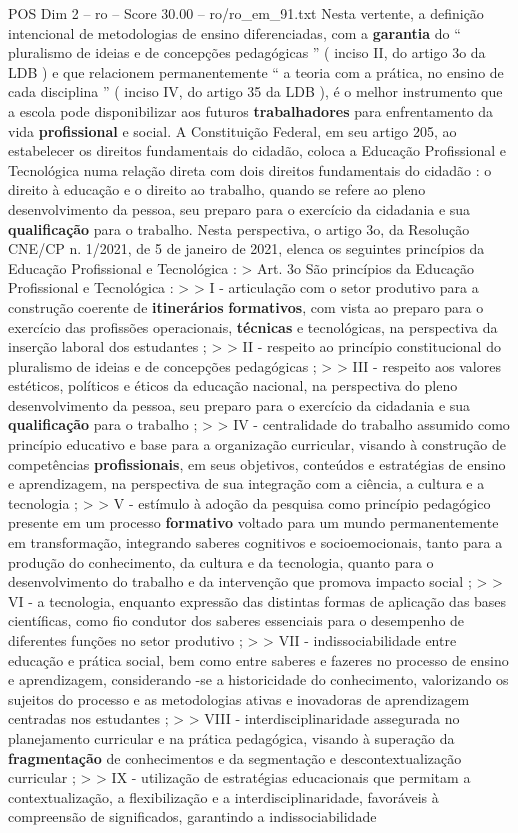 \begin{textsample}{POS Dim 2 – ro – Score 30.00 – ro/ro\_em\_91.txt}
Nesta vertente, a definição intencional de metodologias de ensino diferenciadas, com a \textbf{garantia} do “ pluralismo de ideias e de concepções pedagógicas ” ( inciso II, do artigo 3o da LDB ) e que relacionem permanentemente “ a teoria com a prática, no ensino de cada disciplina ” ( inciso IV, do artigo 35 da LDB ), é o melhor instrumento que a escola pode disponibilizar aos futuros \textbf{trabalhadores} para enfrentamento da vida \textbf{profissional} e social.
A Constituição Federal, em seu artigo 205, ao estabelecer os direitos fundamentais do cidadão, coloca a Educação Profissional e Tecnológica numa relação direta com dois direitos fundamentais do cidadão : o direito à educação e o direito ao trabalho, quando se refere ao pleno desenvolvimento da pessoa, seu preparo para o exercício da cidadania e sua \textbf{qualificação} para o trabalho.
Nesta perspectiva, o artigo 3o, da Resolução CNE/CP n. 1/2021, de 5 de janeiro de 2021, elenca os seguintes princípios da Educação Profissional e Tecnológica : > Art. 3o São princípios da Educação Profissional e Tecnológica : > > I - articulação com o setor produtivo para a construção coerente de \textbf{itinerários} \textbf{formativos}, com vista ao preparo para o exercício das profissões operacionais, \textbf{técnicas} e tecnológicas, na perspectiva da inserção laboral dos estudantes ; > > II - respeito ao princípio constitucional do pluralismo de ideias e de concepções pedagógicas ; > > III - respeito aos valores estéticos, políticos e éticos da educação nacional, na perspectiva do pleno desenvolvimento da pessoa, seu preparo para o exercício da cidadania e sua \textbf{qualificação} para o trabalho ; > > IV - centralidade do trabalho assumido como princípio educativo e base para a organização curricular, visando à construção de competências \textbf{profissionais}, em seus objetivos, conteúdos e estratégias de ensino e aprendizagem, na perspectiva de sua integração com a ciência, a cultura e a tecnologia ; > > V - estímulo à adoção da pesquisa como princípio pedagógico presente em um processo \textbf{formativo} voltado para um mundo permanentemente em transformação, integrando saberes cognitivos e socioemocionais, tanto para a produção do conhecimento, da cultura e da tecnologia, quanto para o desenvolvimento do trabalho e da intervenção que promova impacto social ; > > VI - a tecnologia, enquanto expressão das distintas formas de aplicação das bases científicas, como fio condutor dos saberes essenciais para o desempenho de diferentes funções no setor produtivo ; > > VII - indissociabilidade entre educação e prática social, bem como entre saberes e fazeres no processo de ensino e aprendizagem, considerando -se a historicidade do conhecimento, valorizando os sujeitos do processo e as metodologias ativas e inovadoras de aprendizagem centradas nos estudantes ; > > VIII - interdisciplinaridade assegurada no planejamento curricular e na prática pedagógica, visando à superação da \textbf{fragmentação} de conhecimentos e da segmentação e descontextualização curricular ; > > IX - utilização de estratégias educacionais que permitam a contextualização, a flexibilização e a interdisciplinaridade, favoráveis à compreensão de significados, garantindo a indissociabilidade 
\end{textsample}
